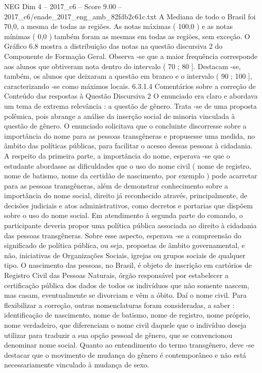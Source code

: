 \begin{textsample}{NEG Dim 4 – 2017\_c6 – Score 9.00 – 2017\_c6/enade\_2017\_eng\_amb\_82fdb2c61c.txt}
A Mediana de todo o Brasil foi 70,0, a mesma de todas as regiões.
As notas máximas ( 100,0 ) e as notas mínimas ( 0,0 ) também foram as mesmas em todas as regiões, sem exceção.
O Gráfico 6.8 mostra a distribuição das notas na questão discursiva 2 do Componente de Formação Geral.
Observa -se que a maior frequência corresponde aos alunos que obtiveram nota dentro do intervalo ( 70 ; 80 ].
Destacam -se, também, os alunos que deixaram a questão em branco e o intervalo ( 90 ; 100 ], caracterizando -se como máximos locais. 6.3.1.4 Comentários sobre a correção de Conteúdo das respostas à Questão Discursiva 2 O enunciado era claro e abordava um tema de extrema relevância : a questão de gênero.
Trata -se de uma proposta polêmica, pois abrange a análise da inserção social de minoria vinculada à questão de gênero.
O enunciado solicitava que o concluinte discorresse sobre a importância do nome para as pessoas transgêneras e propusesse uma medida, no âmbito das políticas públicas, para facilitar o acesso dessas pessoas à cidadania.
A respeito da primeira parte, a importância do nome, esperava -se que o estudante abordasse as dificuldades que o uso do nome civil ( nome de registro, nome de batismo, nome da certidão de nascimento, por exemplo ) pode acarretar para as pessoas transgêneras, além de demonstrar conhecimento sobre a importância do nome social, direito já reconhecido através, principalmente, de decisões judiciais e atos administrativos, como decretos e portarias que dispõem sobre o uso do nome social.
Em atendimento à segunda parte do comando, o participante deveria propor uma política pública associada ao direito à cidadania das pessoas transgêneras.
Sobre esse aspecto, esperava -se a compreensão do significado de política pública, ou seja, propostas de âmbito governamental, e não, iniciativas de Organizações Sociais, igrejas ou grupos sociais de qualquer tipo.
O nascimento das pessoas, no Brasil, é objeto de inscrição em cartórios de Registro Civil das Pessoas Naturais, órgão responsável por estabelecer a certificação pública dos dados de todos os indivíduos que não somente nascem, mas casam, eventualmente se divorciam e vêm a óbito.
Daí o nome civil.
Para flexibilizar a correção, outras nomenclaturas foram consideradas, a saber : identificação de nascimento, nome de batismo, nome de registro, nome próprio, nome verdadeiro, que diferenciam o nome civil daquele que o indivíduo deseja utilizar para traduzir a sua opção pessoal de gênero, que se convencionou denominar nome social.
Quanto ao entendimento do termo transgênero, deve -se destacar que o movimento de mudança do gênero é contemporâneo e não está necessariamente vinculado à mudança de sexo.

\end{textsample}
